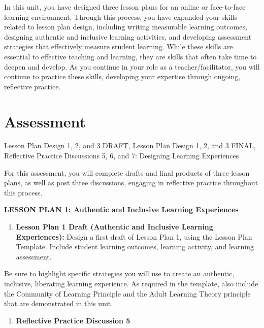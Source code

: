 \documentclass[
]{book}
\providecommand{\tightlist}{%
  \setlength{\itemsep}{0pt}\setlength{\parskip}{0pt}}
\begin{document}
In this unit, you have designed three lesson plans for an online or face-to-face learning environment. Through this process, you have expanded your skills related to lesson plan design, including writing measurable learning outcomes, designing authentic and inclusive learning activities, and developing assessment strategies that effectively measure student learning. While these skills are essential to effective teaching and learning, they are skills that often take time to deepen and develop. As you continue in your role as a teacher/facilitator, you will continue to practice these skills, developing your expertise through ongoing, reflective practice.

\hypertarget{assessment-2}{%
\section*{Assessment}\label{assessment-2}}

{Lesson Plan Design 1, 2, and 3 DRAFT, Lesson Plan Design 1, 2, and 3 FINAL, Reflective Practice Discussions 5, 6, and 7: Designing Learning Experiences}

For this assessment, you will complete drafts and final products of three lesson plans, as well as post three discussions, engaging in reflective practice throughout this process.

\textbf{LESSON PLAN 1: Authentic and Inclusive Learning Experiences}

\begin{enumerate}
\def\labelenumi{\arabic{enumi}.}
\tightlist
\item
  \textbf{Lesson Plan 1 Draft (Authentic and Inclusive Learning Experiences):} Design a first draft of Lesson Plan 1, using the Lesson Plan Template. Include student learning outcomes, learning activity, and learning assessment.
\end{enumerate}

Be sure to highlight specific strategies you will use to create an authentic, inclusive, liberating learning experience. As required in the template, also include the Community of Learning Principle and the Adult Learning Theory principle that are demonstrated in this unit.

\begin{enumerate}
\def\labelenumi{\arabic{enumi}.}
\setcounter{enumi}{1}
\tightlist
\item
  \textbf{Reflective Practice Discussion 5}
\end{enumerate}
\end{document}
